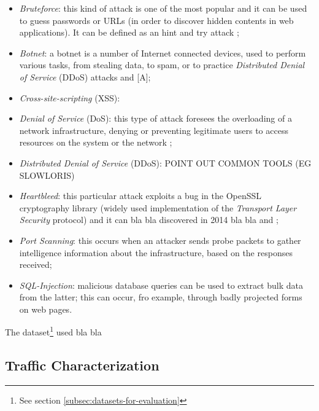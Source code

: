 \begin{itemize}
    \item[\faCaretRight] \textit{Bruteforce}: this kind of attack is one of the most popular and it can be used to guess passwords or URLs (in order to discover hidden contents in web applications). It can be defined as an hint and try attack \cite{icissp18};
    \item[\faCaretRight] \textit{Botnet}: a botnet is a number of Internet connected devices, used to perform various tasks, from stealing data, to spam, or to practice \textit{Distributed Denial of Service} (DDoS) attacks \cite{icissp18} and [A];
    \item[\faCaretRight] \textit{Cross-site-scripting} (XSS):
    \item[\faCaretRight] \textit{Denial of Service} (DoS): this type of attack foresees the overloading of a network infrastructure, denying or preventing legitimate users to access resources on the system or the network \cite{Sharafaldin2019};
    \item[\faCaretRight] \textit{Distributed Denial of Service} (DDoS): POINT OUT COMMON TOOLS (EG SLOWLORIS)
    \item[\faCaretRight] \textit{Heartbleed}: this particular attack exploits a bug in the OpenSSL cryptography library (widely used implementation of the \textit{Transport Layer Security} protocol) and it can bla bla discovered in 2014 bla bla \cite{icissp18} and \cite{Carvalho2014};
    \item[\faCaretRight] \textit{Port Scanning}: this occurs when an attacker sends probe packets to gather intelligence information about the infrastructure, based on the responses received;
    \item[\faCaretRight] \textit{SQL-Injection}: malicious database queries can be used to extract bulk data from the latter; this can occur, fro example, through badly projected forms on web pages.
\end{itemize}

The dataset\footnote{See section \ref{subsec:datasets-for-evaluation}} used bla bla


\subsection{Traffic Characterization}
\label{subsec:traffic-characterization}

